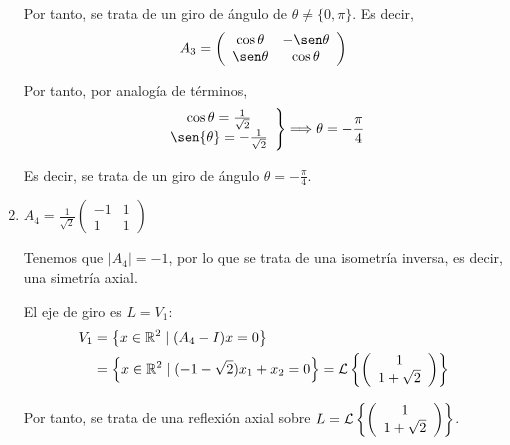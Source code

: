 \begin{ejercicio}
\begin{enumerate}
        Por tanto, se trata de un giro de ángulo de $\theta\neq \{0,\pi\}$. Es decir,
        \begin{equation*}
            A_3=\left(\begin{array}{cc}
                \cos \theta & -\sen \theta \\
                \sen \theta & \cos \theta
            \end{array}\right)
        \end{equation*}

        Por tanto, por analogía de términos,
        \begin{equation*}
            \left.\begin{array}{c}
                \cos{\theta} = \frac{1}{\sqrt{2}} \\
                \sen{\theta} = -\frac{1}{\sqrt{2}}
            \end{array}\right\} \Longrightarrow \theta = -\frac{\pi}{4}
        \end{equation*}
        
        Es decir, se trata de un giro de ángulo $\theta=-\frac{\pi}{4}$.



        \item $A_4=\frac{1}{\sqrt{2}}\left(\begin{array}{cc}
            -1 & 1 \\
            1 & 1
        \end{array}\right)$

        Tenemos que $|A_4|=-1$, por lo que se trata de una isometría inversa, es decir, una simetría axial.

        El eje de giro es $L=V_1$:
        \begin{equation*}
            \begin{split}
                V_1& = \left\{x\in \mathbb{R}^2 \mid (A_4-I)x=0\right\}\\
                & = \left\{x\in \mathbb{R}^2 \mid (-1-\sqrt{2})x_1+x_2=0\right\} = \mathcal{L}\left\{\left(\begin{array}{c}
                     1 \\ 1+\sqrt{2}
                \end{array}\right)\right\}\\
            \end{split}
        \end{equation*}

        Por tanto, se trata de una reflexión axial sobre $L=\mathcal{L}\left\{\left(\begin{array}{c}
                     1 \\ 1+\sqrt{2}
                \end{array}\right)\right\}$.



\end{enumerate}
\end{ejercicio}

